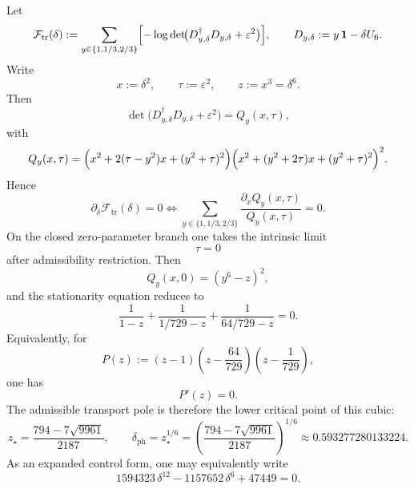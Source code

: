 \begin{theorem}
\label{prop:closed-form-transport-pole}
\label{thm:algebraic-transport-pole}
\label{thm:transport-pole-algebraic}
Let
\[
\mathcal F_{\mathrm{tr}}(\delta)
:=
\sum_{y\in\{1,1/3,2/3\}}
\Bigl[-\log\det\!\bigl(D_{y,\delta}^\dagger D_{y,\delta}+\varepsilon^2\bigr)\Bigr],
\qquad
D_{y,\delta}:=y\,\mathbf 1-\delta U_6.
\]
Write
\[
x:=\delta^2,
\qquad
\tau:=\varepsilon^2,
\qquad
z:=x^3=\delta^6.
\]
Then
\[
\det\!\bigl(D_{y,\delta}^\dagger D_{y,\delta}+\varepsilon^2\bigr)
=
Q_y(x,\tau),
\]
with
\[
Q_y(x,\tau)
=
\Bigl(x^2+2(\tau-y^2)x+(y^2+\tau)^2\Bigr)
\Bigl(x^2+(y^2+2\tau)x+(y^2+\tau)^2\Bigr)^2.
\]
Hence
\[
\partial_\delta \mathcal F_{\mathrm{tr}}(\delta)=0
\iff
\sum_{y\in\{1,1/3,2/3\}}
\frac{\partial_x Q_y(x,\tau)}{Q_y(x,\tau)}=0.
\]
On the closed zero-parameter branch one takes the intrinsic limit
\[
\tau=0
\]
after admissibility restriction. Then
\[
Q_y(x,0)=(y^6-z)^2,
\]
and the stationarity equation reduces to
\[
\frac{1}{1-z}
+
\frac{1}{1/729-z}
+
\frac{1}{64/729-z}
=0.
\]
Equivalently, for
\[
P(z):=
(z-1)\left(z-\frac{64}{729}\right)\left(z-\frac{1}{729}\right),
\]
one has
\[
P'(z)=0.
\]
The admissible transport pole is therefore the lower critical point of this cubic:
\[
z_\star
=
\frac{794-7\sqrt{9961}}{2187},
\qquad
\delta_{\mathrm{ph}}=z_\star^{1/6}
=
\left(\frac{794-7\sqrt{9961}}{2187}\right)^{1/6}
\approx \num{0.593277280133224}.
\]
As an expanded control form, one may equivalently write
\[
1594323\,\delta^{12}-1157652\,\delta^6+47449=0.
\]
\end{theorem}

